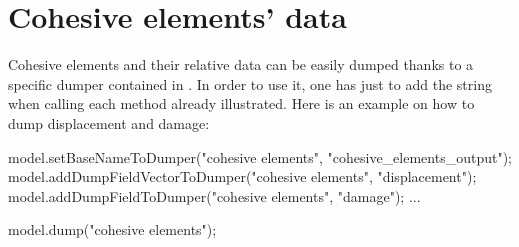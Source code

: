 \section{Cohesive elements' data}
Cohesive elements and their relative data can be easily dumped thanks
to a specific dumper contained in
. In order to use it, one has just
to add the string  when calling each method
already illustrated. Here is an example on how to dump displacement
and damage:
\begin{cpp}
  model.setBaseNameToDumper("cohesive elements", "cohesive_elements_output");
  model.addDumpFieldVectorToDumper("cohesive elements", "displacement");
  model.addDumpFieldToDumper("cohesive elements", "damage");
  ...

  model.dump("cohesive elements");
\end{cpp}


